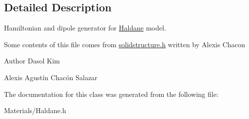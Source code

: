 \subsection{Detailed Description}
Hamiltonian and dipole generator for \hyperlink{class_haldane}{Haldane} model. 

Some contents of this file comes from \textquotesingle{}\hyperlink{solidstructure_8h_source}{solidstructure.\+h}\textquotesingle{} written by Alexis Chacon \begin{DoxyAuthor}{Author}
Dasol Kim 

Alexis Agustín Chacón Salazar 
\end{DoxyAuthor}


The documentation for this class was generated from the following file\+:\begin{DoxyCompactItemize}
\item 
Materials/Haldane.\+h\end{DoxyCompactItemize}

